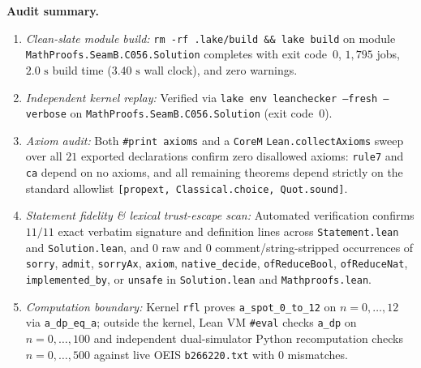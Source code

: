 \documentclass[11pt]{article}
\theoremstyle{definition}
\begin{document}
\noindent\textbf{Audit summary.}
\begin{enumerate}
\item \emph{Clean-slate module build:} \texttt{rm -rf .lake/build \&\& lake build} on module \nolinkurl{MathProofs.SeamB.C056.Solution} completes with exit code~$0$, $1{,}795$ jobs, $2.0\text{ s}$ build time ($3.40\text{ s}$ wall clock), and zero warnings.
\item \emph{Independent kernel replay:} Verified via \texttt{lake env leanchecker --fresh --verbose} on \nolinkurl{MathProofs.SeamB.C056.Solution} (exit code~$0$).
\item \emph{Axiom audit:} Both \texttt{\#print axioms} and a \texttt{CoreM} \texttt{Lean.collectAxioms} sweep over all $21$ exported declarations confirm zero disallowed axioms: \texttt{rule7} and \texttt{ca} depend on no axioms, and all remaining theorems depend strictly on the standard allowlist \texttt{[propext, Classical.choice, Quot.sound]}.
\item \emph{Statement fidelity \& lexical trust-escape scan:} Automated verification confirms $11/11$ exact verbatim signature and definition lines across \texttt{Statement.lean} and \texttt{Solution.lean}, and $0$ raw and $0$ comment/string-stripped occurrences of \texttt{sorry}, \texttt{admit}, \texttt{sorryAx}, \texttt{axiom}, \texttt{native\_decide}, \texttt{ofReduceBool}, \texttt{ofReduceNat}, \texttt{implemented\_by}, or \texttt{unsafe} in \texttt{Solution.lean} and \texttt{Mathproofs.lean}.
\item \emph{Computation boundary:} Kernel \texttt{rfl} proves \texttt{a\_spot\_0\_to\_12} on $n = 0, \dots, 12$ via \texttt{a\_dp\_eq\_a}; outside the kernel, Lean VM \texttt{\#eval} checks \texttt{a\_dp} on $n = 0, \dots, 100$ and independent dual-simulator Python recomputation checks $n = 0, \dots, 500$ against live OEIS \texttt{b266220.txt} with $0$ mismatches.
\end{enumerate}
\end{document}
